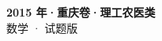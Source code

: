\documentclass[zihao=-4, a4paper]{ctexart}
\begin{document}
\begin{center}
  {\Large\bfseries 2015 年·重庆卷·理工农医类}\\[4pt]
  {\large 数学 · 试题版}
\end{center}
\medskip
{}

\end{document}

